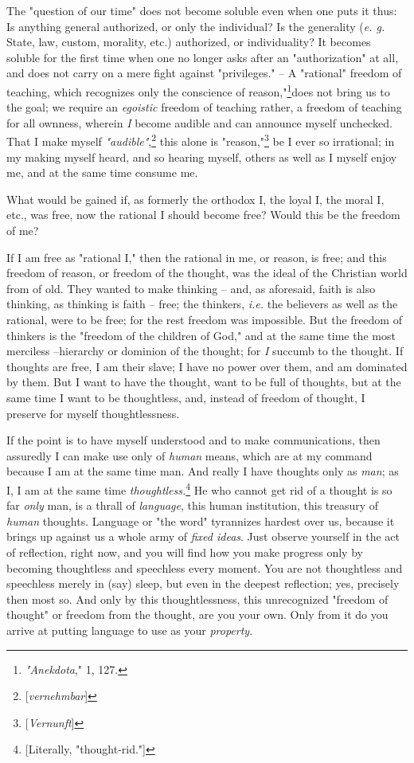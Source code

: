\documentclass[a4paper]{book}
\begin{document}
The "{}question of our time"{} does not become soluble even when one puts it 
thus: Is anything general authorized, or only the individual? Is the 
generality (\textit{e. g.} State, law, custom, morality, etc.) authorized, or 
individuality? It becomes soluble for the first time when one no longer asks 
after an "{}authorization"{} at all, and does not carry on a mere fight 
against "{}privileges."{} -- A "{}rational"{} freedom of teaching, which 
recognizes only the conscience of reason,"{}\footnote{\textit{"{}Anekdota},"{} 
1, 127. }does not bring us to the goal; we require an \textit{egoistic} 
freedom of teaching rather, a freedom of teaching for all ownness, wherein 
\textit{I} become audible and can announce myself unchecked. That I make 
myself \textit{"{}audible"{}},\footnote{[\textit{vernehmbar}]} this alone is 
"{}reason,"{}\footnote{[\textit{Vernunft}]} be I ever so irrational; in my 
making myself heard, and so hearing myself, others as well as I myself enjoy 
me, and at the same time consume me.

What would be gained if, as formerly the orthodox I, the loyal I, the moral I, 
etc., was free, now the rational I should become free? Would this be the 
freedom of me?

If I am free as "{}rational I,"{} then the rational in me, or reason, is free; 
and this freedom of reason, or freedom of the thought, was the ideal of the 
Christian world from of old. They wanted to make thinking -- and, as 
aforesaid, faith is also thinking, as thinking is faith -- free; the thinkers, 
\textit{i.e.} the believers as well as the rational, were to be free; for the 
rest freedom was impossible. But the freedom of thinkers is the "{}freedom of 
the children of God,"{} and at the same time the most merciless --hierarchy or 
dominion of the thought; for \textit{I} succumb to the thought. If thoughts 
are free, I am their slave; I have no power over them, and am dominated by 
them. But I want to have the thought, want to be full of thoughts, but at the 
same time I want to be thoughtless, and, instead of freedom of thought, I 
preserve for myself thoughtlessness.

If the point is to have myself understood and to make communications, then 
assuredly I can make use only of \textit{human} means, which are at my command 
because I am at the same time man. And really I have thoughts only as 
\textit{man}; as I, I am at the same time 
\textit{thoughtless.}\footnote{[Literally, "{}thought-rid."{}]} He who cannot 
get rid of a thought is so far \textit{only} man, is a thrall of 
\textit{language}, this human institution, this treasury of \textit{human} 
thoughts. Language or "{}the word"{} tyrannizes hardest over us, because it 
brings up against us a whole army of \textit{fixed ideas}. Just observe 
yourself in the act of reflection, right now, and you will find how you make 
progress only by becoming thoughtless and speechless every moment. You are not 
thoughtless and speechless merely in (say) sleep, but even in the deepest 
reflection; yes, precisely then most so. And only by this thoughtlessness, 
this unrecognized "{}freedom of thought"{} or freedom from the thought, are 
you your own. Only from it do you arrive at putting language to use as your 
\textit{property}.
\end{document}
